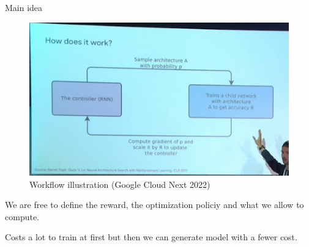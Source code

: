 \documentclass{beamer}
\begin{document}
\begin{frame}{Main idea}
\begin{figure}
    \centering
    \includegraphics[width=0.6\linewidth]{GOOGLE.png}
    \caption{Workflow illustration (Google Cloud Next 2022)}
    \label{fig:enter-label}
\end{figure}

We are free to define the reward, the optimization policiy and what we allow to compute.

\textcolor{mBlue}{Costs a lot to train at first but then we can generate model with a fewer cost}.
\end{frame}
\end{document}
